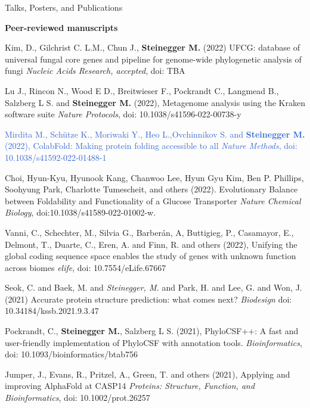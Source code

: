 \documentclass{resume} %
\begin{document}
\begin{rSection}{Talks, Posters, and Publications}
\begin{thebibliography}{10}
\end{thebibliography}


{\bf Peer-reviewed manuscripts}\\[-26mm]

\begin{thebibliography}{10}

\vspace{8mm}
Kim, D., Gilchrist C. L.M., Chun J., {\bf Steinegger M.} (2022)
UFCG: database of universal fungal core genes and pipeline for genome-wide phylogenetic analysis of fungi  {\em Nucleic Acids Research, accepted}, doi: TBA

Lu J., Rincon N., Wood E D., Breitwieser F., Pockrandt C., Langmead B., Salzberg L S.  and {\bf Steinegger M.} (2022), 
Metagenome analysis using the Kraken software suite {\em Nature Protocols}, doi: 10.1038/s41596-022-00738-y


\textcolor{highlight}{
Mirdita M., Schütze K., Moriwaki Y., Heo L.,Ovchinnikov S. and {\bf Steinegger M.} (2022), 
ColabFold: Making protein folding accessible to all {\em Nature Methods}, doi: 10.1038/s41592-022-01488-1
}

\newpage

Choi, Hyun-Kyu, Hyunook Kang, Chanwoo Lee, Hyun Gyu Kim, Ben P. Phillips, Soohyung Park, Charlotte Tumescheit, and others (2022). 
Evolutionary Balance between Foldability and Functionality of a Glucose Transporter {\em Nature Chemical Biology}, doi:10.1038/s41589-022-01002-w.

Vanni, C., Schechter, M., Silvia G., Barber{\'a}n, A, Buttigieg, P., Casamayor, E., Delmont, T., Duarte, C., Eren, A. and Finn, R. and others (2022), 
Unifying the global coding sequence space enables the study of genes with unknown function across biomes {\em elife}, doi: 10.7554/eLife.67667

Seok, C. and Baek, M. and {\em Steinegger, M.} and Park, H. and Lee, G. and Won, J. (2021)
Accurate protein structure prediction: what comes next? {\em Biodesign} doi: 10.34184/kssb.2021.9.3.47

Pockrandt, C.,  {\bf Steinegger M.}, Salzberg L S. (2021),  
PhyloCSF++: A fast and user-friendly implementation of PhyloCSF with annotation tools. {\em Bioinformatics}, doi:  10.1093/bioinformatics/btab756

Jumper, J., Evans, R., Pritzel, A., Green, T. and others (2021),
Applying and improving AlphaFold at CASP14 {\em Proteins: Structure, Function, and Bioinformatics}, doi: 10.1002/prot.26257


\end{thebibliography}
\end{rSection}
\end{document}
